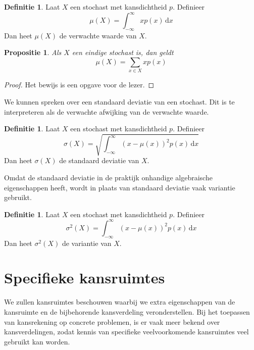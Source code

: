 \documentclass[a4paper]{book}
\newtheorem{proposition}[theorem]{Propositie}
\theoremstyle{definition}
\newtheorem{definition}[theorem]{Definitie}
\begin{document}
\begin{definition}
    Laat $X$ een stochast met kansdichtheid $p$.
    Definieer \[ \mu(X) = \int_{-\infty}^{\infty} \! xp(x)  \, \mathrm{d}x \]
    Dan heet $\mu(X)$ de verwachte waarde van $X$.
\end{definition}

\begin{proposition}
    Als $X$ een eindige stochast is, dan geldt
    \[ \mu(X) = \sum_{x \in X} xp(x)\]
\end{proposition}
\begin{proof}
    Het bewijs is een opgave voor de lezer.
\end{proof}

We kunnen spreken over een standaard deviatie van een stochast. Dit is te interpreteren als de verwachte afwijking van de verwachte waarde.

\begin{definition}
    Laat $X$ een stochast met kansdichtheid $p$.
    Definieer \[ \sigma(X) = \sqrt{\int_{-\infty}^{\infty} \! (x - \mu(x))^2 p(x)  \, \mathrm{d}x} \]
    Dan heet $\sigma(X)$ de standaard deviatie van $X$.
\end{definition}

Omdat de standaard deviatie in de praktijk onhandige algebraische eigenschappen heeft, wordt in plaats van standaard deviatie vaak variantie gebruikt.

\begin{definition}
    Laat $X$ een stochast met kansdichtheid $p$.
    Definieer \[ \sigma^2(X) = \int_{-\infty}^{\infty} \! (x - \mu(x))^2 p(x)  \, \mathrm{d}x \]
    Dan heet $\sigma^2(X)$ de variantie van $X$.
\end{definition}



\chapter{Specifieke kansruimtes}
We zullen kansruimtes beschouwen waarbij we extra eigenschappen van de kansruimte en de bijbehorende kansverdeling veronderstellen.
Bij het toepassen van kansrekening op concrete problemen, is er vaak meer bekend over kansverdelingen, zodat kennis van specifieke veelvoorkomende kansruimtes veel gebruikt kan worden.

%
%
%
\end{document}
